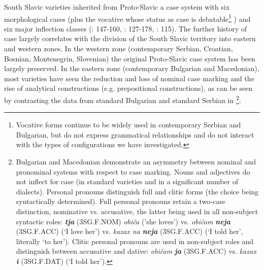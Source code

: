 \documentclass[output=paper]{langscibook}
\begin{document}
South Slavic varieties inherited from Proto-Slavic a case system with six morphological cases (plus the vocative whose status as case is debatable\footnote{Vocative forms continue to be widely used in contemporary Serbian and Bulgarian, but do not express grammatical relationships \citep[8]{Blake2004} and do not interact with the types of configurations we have investigated.} ) and six major inflection classes (\citealt{Mirčev1958}: 147-160, \citealt{Slavova2017}: 127-178, \citealt{Popović1955}: 115). The further history of case largely correlates with the division of the South Slavic territory into eastern and western zones. In the western zone (contemporary Serbian, Croatian, Bosnian, Montenegrin, Slovenian) the original Proto-Slavic case system has been largely preserved. In the eastern zone (contemporary Bulgarian and Macedonian), most varieties have seen the reduction and loss of nominal case marking and the rise of analytical constructions (e.g. prepositional constructions), as can be seen by contrasting the data from standard Bulgarian and standard Serbian in \footnote{Bulgarian and Macedonian demonstrate an asymmetry between nominal and pronominal systems with respect to case marking. Nouns and adjectives do not inflect for case (in standard varieties and in a significant number of dialects). Personal pronouns distinguish full and clitic forms (the choice being syntactically determined). Full personal pronouns retain a two-case distinction, nominative vs. accusative, the latter being used in all non-subject syntactic roles: \textbf{\textit{tja}} (3SG.F.NOM) \textit{obi}\textrm{\textit{č}}\textit{a} (’she loves’) vs. \textit{obi}\textrm{\textit{č}}\textit{am} \textbf{\textit{neja}} (3SG.F.ACC) (‘I love her’) vs. \textit{kazax na} \textbf{\textit{neja}} (3SG.F.ACC) (‘I told her’, literally ‘to her’). Clitic personal pronouns are used in non-subject roles and distinguish between accusative and dative: \textit{obi}\textrm{\textit{č}}\textit{am} \textbf{\textit{ja}} (3SG.F.ACC) vs. \textit{kazax} \textrm{\textbf{\textit{ì}}} (3SG.F.DAT)  (‘I told her’).}.
\end{document}
